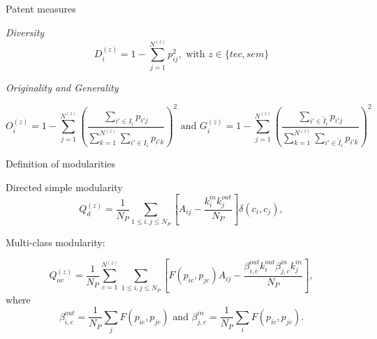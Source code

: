 \documentclass{beamer}
\begin{document}
\begin{frame}{Patent measures}
\label{slide:measures}
\hyperlink{slide:diversity}{}
    
    \textit{Diversity}
    \[
D_i^{(z)} = 1 - \sum_{j =1}^{N^{(z)}} {p_{ij}^2}, \text{ with } z \in \{tec, sem\}
	\]
    
    \medskip

	\textit{Originality and Generality}

	\[
O_i^{(z)} = \displaystyle 1 - \sum_{j =1}^{N^{(z)}}{\left(\frac{\displaystyle \sum_{i' \in I_i}{p_{i'j}}}{\displaystyle \sum_{k =1}^{N^{(z)}}{\displaystyle \sum_{i' \in I_i}{p_{i'k}}}}\right)^2}
\text{ and } G_i^{(z)} = \displaystyle 1 - \sum_{j =1}^{N^{(z)}}{\left(\frac{\displaystyle \sum_{i' \in \tilde{I}_i}{p_{i'j}}}{\displaystyle \sum_{k =1}^{N^{(z)}}{\displaystyle \sum_{i' \in \tilde{I}_i}{p_{i'k}}}}\right)^2}
\]
    

    
\end{frame}

\begin{frame}{Definition of modularities} \label{slide:modularity_def}
\hyperlink{slide:modularity}{}


    Directed simple modularity \cite{nicosia2009extending}
    \[
Q_d^{(z)} = \displaystyle \frac{1}{N_P}\sum_{1\leq i,j\leq N_P}\left[A_{ij} - \frac{k_{i}^{in}k_{j}^{out}}{N_P}\right]\delta(c_i,c_j),
\]


\bigskip

Multi-class modularity:

\[
\displaystyle Q_{ov}^{(z)} = \frac{1}{N_P} \sum_{c = 1}^{N^{(z)}} \sum_{1\leq i,j \leq N_P}\left[F(p_{ic},p_{jc})A_{ij} - \frac{\beta_{i,c}^{out}k_i^{out}\beta_{j,c}^{in}k_j^{in}}{N_P}\right],
\]
where
\[
 \beta_{i,c}^{out} =   \frac{1}{N_P} \displaystyle \sum_j F(p_{ic},p_{jc}) \text{ and } \beta_{j,c}^{in} =  \frac{1}{N_P} \displaystyle \sum_i F(p_{ic},p_{jc}).
\]
    
\end{frame}
\end{document}
